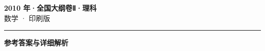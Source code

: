 \documentclass[zihao=5, a4paper]{ctexart}
\begin{document}
\begin{center}
  {\Large\bfseries 2010 年·全国大纲卷Ⅱ·理科}\\[4pt]
  {\large 数学 · 印刷版}
\end{center}
\medskip
{}

\par\bigskip\hrule\bigskip
{}
\begin{center}{\large\bfseries 参考答案与详细解析}\end{center}
\smallskip

\end{document}

